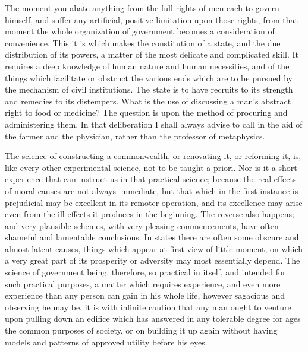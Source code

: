The moment you abate anything from the full rights of men each to govern himself, and suffer any artificial, positive limitation upon those rights, from that moment the whole organization of government becomes a consideration of convenience. This it is which makes the constitution of a state, and the due distribution of its powers, a matter of the most delicate and complicated skill. It requires a deep knowledge of human nature and human necessities, and of the things which facilitate or obstruct the various ends which are to be pursued by the mechanism of civil institutions. The state is to have recruits to its strength and remedies to its distempers. What is the use of discussing a man's abstract right to food or medicine? The question is upon the method of procuring and administering them. In that deliberation I shall always advise to call in the aid of the farmer and the physician, rather than the professor of metaphysics.

The science of constructing a commonwealth, or renovating it, or reforming it, is, like every other experimental science, not to be taught a priori. Nor is it a short experience that can instruct us in that practical science; because the real effects of moral causes are not always immediate, but that which in the first instance is prejudicial may be excellent in its remoter operation, and its excellence may arise even from the ill effects it produces in the beginning. The reverse also happens; and very plausible schemes, with very pleasing commencements, have often shameful and lamentable conclusions. In states there are often some obscure and almost latent causes, things which appear at first view of little moment, on which a very great part of its prosperity or adversity may most essentially depend. The science of government being, therefore, so practical in itself, and intended for such practical purposes, a matter which requires experience, and even more experience than any person can gain in his whole life, however sagacious and observing he may be, it is with infinite caution that any man ought to venture upon pulling down an edifice which has answered in any tolerable degree for ages the common purposes of society, or on building it up again without having models and patterns of approved utility before his eyes.

